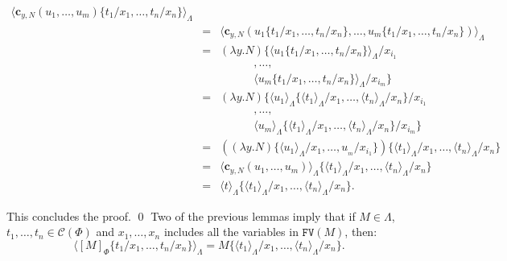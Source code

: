 \documentclass{LMCS}
\newcommand{\varone}{x}
\newcommand{\vartwo}{y}
\newcommand{\lambdaone}{M}
\newcommand{\lambdatwo}{N}
\newcommand{\termone}{t}
\newcommand{\termtwo}{u}
\newcommand{\constr}[2]{\mathbf{c}_{#1,#2}}
\newcommand{\LambdatoTRS}[1]{[#1]_{\Phi}}
\newcommand{\TRStolambda}[1]{\langle{#1}\rangle_{\Lambdaterms}}
\newcommand{\Lambdaterms}{\Lambda}
\newcommand{\TRSconterms}{\mathcal{C}(\Phi)}
\newcommand{\FV}[1]{\mathtt{FV}(#1)}
\newenvironment{varitemize}
{
\begin{list}{\labelitemi}
{\setlength{\itemsep}{0.0mm}
 \setlength{\topsep}{0.0mm}
 \setlength{\parindent}{0.0mm}
 \setlength{\parskip}{0.0mm}
 \setlength{\parsep}{0.0mm}
 \setlength{\partopsep}{0.0mm}
 \setlength{\leftmargin}{15pt}
 \setlength{\labelsep}{5pt}
 \setlength{\labelwidth}{10pt}}}
{
 \end{list} 
}
\begin{document}
\begin{varitemize}
\begin{eqnarray*}
      \TRStolambda{\constr{\vartwo}{\lambdatwo}(\termtwo_{1},\ldots,\termtwo_{m})
        \{\termone_1/\varone_1,\ldots,\termone_n/\varone_n\}}\\
      &=&\TRStolambda{\constr{\vartwo}{\lambdatwo}
        (\termtwo_{1}\{\termone_1/\varone_1,\ldots,\termone_n/\varone_n\},\ldots,
         \termtwo_{m}\{\termone_1/\varone_1,\ldots,\termone_n/\varone_n\})}\\
      &=&(\lambda\vartwo.\lambdatwo)\{
         \TRStolambda{\termtwo_{1}\{\termone_1/\varone_1,\ldots,\termone_n/\varone_n\}}/\varone_{i_1}\\
         & &\hspace{36pt},\ldots,\\
         & &\hspace{36pt}\TRStolambda{\termtwo_{m}\{\termone_1/\varone_1,\ldots,\termone_n/\varone_n\}}/\varone_{i_m}\}\\
      &=&(\lambda\vartwo.\lambdatwo)\{\TRStolambda{\termtwo_{1}}\{\TRStolambda{\termone_1}/\varone_1,\ldots,
         \TRStolambda{\termone_n}/\varone_n\}/\varone_{i_1}\\
         & &\hspace{36pt},\ldots,\\
         & &\hspace{36pt}\TRStolambda{\termtwo_m}\{\TRStolambda{\termone_1}/\varone_1,\ldots,\TRStolambda{\termone_n}/\varone_n\}/\varone_{i_m}\}\\
      &=&((\lambda\vartwo.\lambdatwo)\{\TRStolambda{\termtwo_{1}}/\varone_1,\ldots,\termtwo_{_m}/\varone_{i_1}\})
         \{\TRStolambda{\termone_1}/\varone_1,\ldots,\TRStolambda{\termone_n}/\varone_n\}\\
      &=&\TRStolambda{\constr{\vartwo}{\lambdatwo}(\termtwo_{1},\ldots,\termtwo_{m})}\{\TRStolambda{\termone_1}/\varone_1,\ldots,\TRStolambda{\termone_n}/\varone_n\}\\
      &=&\TRStolambda{\termone}\{\TRStolambda{\termone_1}/\varone_1,\ldots,\TRStolambda{\termone_n}/\varone_n\}.
    \end{eqnarray*}
\end{varitemize}
This concludes the proof.
\qed
Two of the previous lemmas imply that if $\lambdaone\in\Lambdaterms$, 
$\termone_1,\ldots,\termone_n\in\TRSconterms$ and $\varone_1,\ldots,\varone_n$ 
includes all the variables in $\FV{\lambdaone}$, then:
\begin{equation}\label{equat:commute}
\TRStolambda{\LambdatoTRS{\lambdaone}\{\termone_1/\varone_1,\ldots,\termone_n/\varone_n\}}=
\lambdaone\{\TRStolambda{\termone_1}/\varone_1,\ldots,\TRStolambda{\termone_n}/\varone_n\}.
\end{equation}
\end{document}
